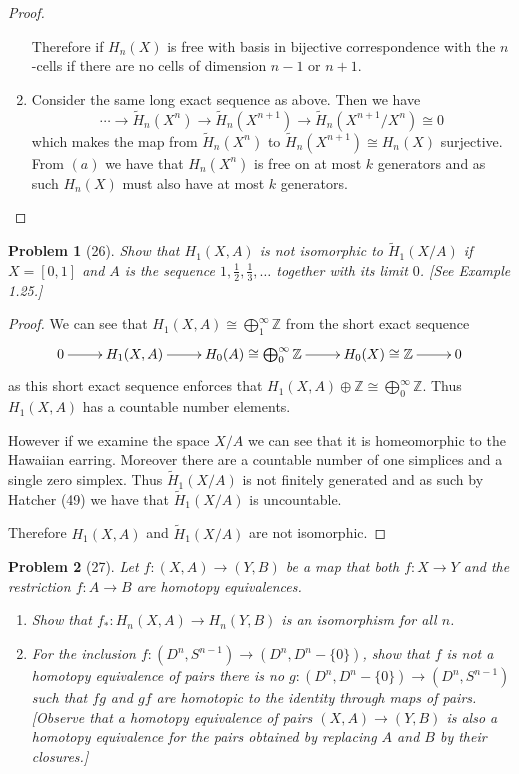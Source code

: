 \documentclass[10pt]{article}
\newcommand{\sk}{\vskip 10mm}
\newcommand{\bb}[1]{\mathbb{#1}}
\newcommand{\wt}[1]{\widetilde{#1}}
\theoremstyle{plain}
\newtheorem{problem}{Problem}
\theoremstyle{remark}
\begin{document}
\begin{proof}
\begin{enumerate}
    Therefore if $H_n(X)$ is free with basis in bijective correspondence
    with the $n$-cells if there are no cells of dimension $n-1$ or $n+1$.
  \item[(c)]
    Consider the same long exact sequence as above. Then we have
    \[
      \cdots \rightarrow \wt{H}_n(X^n)\rightarrow\wt{H}_n(X^{n+1})\rightarrow\wt{H}_n(X^{n+1}/X^n)\cong 0
    \]
    which makes the map from $\wt{H}_n(X^n)$ to $\wt{H}_n(X^{n+1})\cong H_n(X)$
    surjective. From $(a)$ we have that $H_n(X^n)$ is free on at most
    $k$ generators and as such $H_n(X)$ must also have at most $k$
    generators.
  \end{enumerate}
\end{proof}

\sk

\begin{problem}[26]
  Show that $H_1(X,A)$ is not isomorphic to $\widetilde{H}_1(X/A)$ if
  $X=[0,1]$ and $A$ is the sequence $1,\frac{1}{2},\frac{1}{3},\ldots$
  together with its limit $0$. [See Example 1.25.]
\end{problem}

\begin{proof}
  We can see that $H_1(X,A)\cong\bigoplus_1^\infty\bb{Z}$ from the short exact sequence
  \[
    \xymatrix{
      0\ar[r] & H_1(X,A) \ar[r] & H_0(A)\cong \bigoplus_0^\infty\bb{Z} \ar[r] & H_0(X)\cong \bb{Z} \ar[r] & 0
    }
  \]
  as this short exact sequence enforces that $H_1(X,A)\oplus \bb{Z}\cong \bigoplus_0^\infty\bb{Z}$. Thus
  $H_1(X,A)$ has a countable number elements.

  However if we examine the space $X/A$ we can see that it is homeomorphic to the
  Hawaiian earring. Moreover there are a countable number of one simplices and
  a single zero simplex. Thus $\widetilde{H}_1(X/A)$ is not finitely generated
  and as such by Hatcher (49) we have that $\widetilde{H}_1(X/A)$ is uncountable.

  Therefore $H_1(X,A)$ and $\widetilde{H}_1(X/A)$ are not isomorphic.
\end{proof}

\sk

\begin{problem}[27]
  Let $f:(X,A)\rightarrow(Y,B)$ be a map that both $f:X\rightarrow Y$ and the restriction
  $f:A\rightarrow B$ are homotopy equivalences.
  \begin{enumerate}
  \item[(a)] Show that $f_*:H_n(X,A)\rightarrow H_n(Y,B)$ is an
    isomorphism for all $n$.
  \item[(b)] For the inclusion $f:(D^n,S^{n-1})\rightarrow(D^n,D^n-\{0\})$, show
    that $f$ is not a homotopy equivalence of pairs \textemdash there
    is no $g:(D^n,D^n-\{0\})\rightarrow(D^n,S^{n-1})$ such that $fg$
    and $gf$ are homotopic to the identity through maps of pairs.
    [Observe that a homotopy equivalence of pairs $(X,A)\rightarrow(Y,B)$
    is also a homotopy equivalence for the pairs obtained by
    replacing $A$ and $B$ by their closures.]
  \end{enumerate}
\end{problem}
\end{document}
